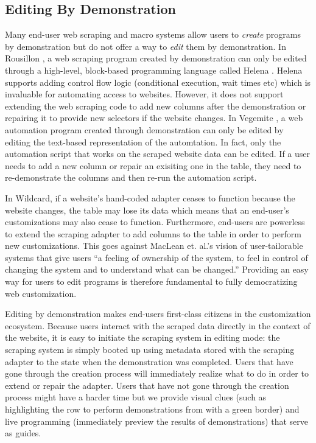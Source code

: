 \documentclass[sigconf,10pt]{acmart}
\begin{document}
\hypertarget{editing-by-demonstration-1}{%
\subsection{Editing By Demonstration}\label{editing-by-demonstration-1}}

Many end-user web scraping and macro systems allow users to
\emph{create} programs by demonstration but do not offer a way to
\emph{edit} them by demonstration. In Rousillon \citep{chasins2018}, a
web scraping program created by demonstration can only be edited through
a high-level, block-based programming language called Helena
\citep{zotero-51}. Helena supports adding control flow logic
(conditional execution, wait times etc) which is invaluable for
automating access to websites. However, it does not support extending
the web scraping code to add new columns after the demonstration or
repairing it to provide new selectors if the website changes. In
Vegemite \citep{lin2009}, a web automation program created through
demonstration can only be edited by editing the text-based
representation of the automtation. In fact, only the automation script
that works on the scraped website data can be edited. If a user needs to
add a new column or repair an exisiting one in the table, they need to
re-demonstrate the columns and then re-run the automation script.

In Wildcard, if a website's hand-coded adapter ceases to function
because the website changes, the table may lose its data which means
that an end-user's customizations may also cease to function.
Furthermore, end-users are powerless to extend the scraping adapter to
add columns to the table in order to perform new customizations. This
goes against MacLean et. al.'s vision of user-tailorable systems
\citep{maclean1990} that give users ``a feeling of ownership of the
system, to feel in control of changing the system and to understand what
can be changed.'' Providing an easy way for users to edit programs is
therefore fundamental to fully democratizing web customization.

Editing by demonstration makes end-users first-class citizens in the
customization ecosystem. Because users interact with the scraped data
directly in the context of the website, it is easy to initiate the
scraping system in editing mode: the scraping system is simply booted up
using metadata stored with the scraping adapter to the state when the
demonstration was completed. Users that have gone through the creation
process will immediately realize what to do in order to extend or repair
the adapter. Users that have not gone through the creation process might
have a harder time but we provide visual clues (such as highlighting the
row to perform demonstrations from with a green border) and live
programming (immediately preview the results of demonstrations) that
serve as guides.
\end{document}
